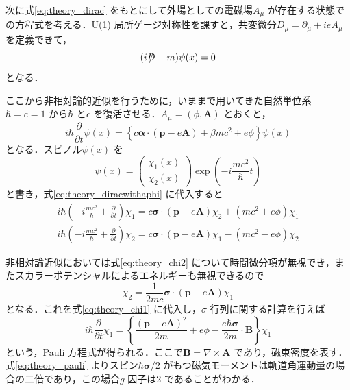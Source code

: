 次に式\eqref{eq:theory_dirac} をもとにして外場としての電磁場$A_{\mu}$ が存在する状態での方程式を考える．U(1) 局所ゲージ対称性を課すと，共変微分$D_{\mu} = \partial_{\mu} + ieA_{\mu}$ を定義できて，
\begin{equation}
(i\Slash{D} - m)\psi(x) = 0
\label{eq:theory_diracwitha}
\end{equation}
となる．

ここから非相対論的近似を行うために，いままで用いてきた自然単位系$\hbar = c = 1$ から$\hbar$ と$c$ を復活させる．$A_{\mu} = (\phi, \bm{A})$ とおくと，
\begin{equation}
i\hbar\frac{\partial}{\partial t}\psi(x) = \left\{c\bm{\alpha}\cdot (\bm{p} - e\bm{A}) + \beta m c^{2} + e \phi\right\}\psi(x)
\label{eq:theory_diracwithaphi}
\end{equation}
となる．スピノル$\psi(x)$ を
\begin{equation}
\psi(x) = \begin{pmatrix}
\chi_{1} (x)\\
\chi_{2} (x)
\end{pmatrix} \exp \left( - i \frac{mc^{2}}{\hbar} t\right)
\end{equation}
と書き，式\eqref{eq:theory_diracwithaphi} に代入すると
\begin{align}
i\hbar\left( -i\frac{mc^{2}}{\hbar} + \frac{\partial}{\partial t}\right) \chi_{1} = c\bm{\sigma}\cdot(\bm{p} - e \bm{A})\chi_{2} + (mc^{2} + e\phi)\chi_{1} \label{eq:theory_chi1}\\ 
i\hbar\left( -i\frac{mc^{2}}{\hbar} + \frac{\partial}{\partial t}\right) \chi_{2} = c\bm{\sigma}\cdot(\bm{p} - e \bm{A})\chi_{1} - (mc^{2} - e\phi)\chi_{2} \label{eq:theory_chi2}
\end{align}

非相対論近似においては式\eqref{eq:theory_chi2} について時間微分項が無視でき，またスカラーポテンシャルによるエネルギーも無視できるので
\begin{equation}
\chi_{2} = \frac{1}{2mc}\bm{\sigma}\cdot(\bm{p} - e\bm{A})\chi_{1}
\end{equation}
となる．これを式\eqref{eq:theory_chi1} に代入し，$\sigma$ 行列に関する計算を行えば
\begin{equation}
i\hbar\frac{\partial}{\partial t}\chi_{1} = \left\{\frac{(\bm{p} - e\bm{A})^{2}}{2m} + e\phi - \frac{e\hbar\bm{\sigma}}{2m}\cdot\bm{B}\right\}\chi_{1}
\label{eq:theory_pauli}
\end{equation}
という，Pauli 方程式が得られる．ここで$\bm{B} = \nabla \times \bm{A}$ であり，磁束密度を表す．式\eqref{eq:theory_pauli} よりスピン$\hbar\bm{\sigma}/2$ がもつ磁気モーメントは軌道角運動量の場合の二倍であり，この場合$g$ 因子は2 であることがわかる．

